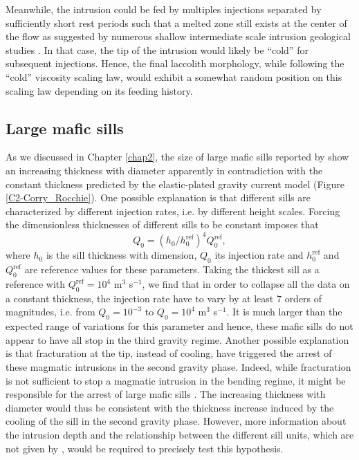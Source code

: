 Meanwhile,  the  intrusion  could   be  fed  by  multiples  injections
separated by sufficiently  short rest periods such that  a melted zone
still  exists at  the  center of  the flow  as  suggested by  numerous
shallow    intermediate    scale    intrusion    geological    studies
\citep{Habert:2004wg,Horsman:2005ct,Morgan:2008hj,Roni:2014gt}.     In
that  case, the  tip of  the intrusion  would likely  be ``cold''  for
subsequent injections.   Hence, the final laccolith  morphology, while
following the ``cold'' viscosity scaling law, would exhibit a somewhat
random position on this scaling law depending on its feeding history.


\subsection{Large mafic sills}
\label{sec:large-mafic-sill}

As we discussed in Chapter \ref{chap2},  the size of large mafic sills
reported  by  \citet{Cruden:tg}  show  an  increasing  thickness  with
diameter  apparently  in  contradiction with  the  constant  thickness
predicted  by   the  elastic-plated  gravity  current   model  (Figure
\ref{C2-Corry_Rocchie}).  One  possible explanation is  that different
sills  are  characterized  by  different  injection  rates,  i.e.   by
different  height scales.   Forcing the  dimensionless thicknesses  of
different sills to be constant imposes that
\begin{equation}
  Q_0 = (h_0/h_0^{\text{ref}})^4Q_0^{\text{ref}},
\end{equation}
where $h_0$ is the sill  thickness with dimension, $Q_0$ its injection
rate  and  $h_0^{\text{ref}}$  and  $Q_0^{\text{ref}}$  are  reference
values for these  parameters.  Taking the thickest sill  as a reference
with $Q_0^{\text{ref}} =  10^4$ m$^3$ s$^{-1}$, we find  that in order
to collapse all  the data on a constant thickness,  the injection rate
have  to  vary by  at  least  $7$  orders  of magnitudes,  i.e.   from
$Q_0=10^{-3}$ to $Q_0= 10^{4}$ m$^3$  s$^{-1}$. It is much larger than
the expected range  of variations for this parameter  and hence, these
mafic  sills do  not appear  to  have all  stop in  the third  gravity
regime. Another possible explanation is  that fracturation at the tip,
instead  of  cooling, have  triggered  the  arrest of  these  magmatic
intrusions in the second gravity phase.  Indeed, while fracturation is
not sufficient to stop a magmatic  intrusion in the bending regime, it
might   be  responsible   for  the   arrest  of   large  mafic   sills
\citep{Michaut:2011kg}.  The increasing  thickness with diameter would
thus be consistent with the  thickness increase induced by the cooling
of the  sill in the  second gravity phase.  However,  more information
about the intrusion  depth and the relationship  between the different
sill  units,  which  are  not given  by  \citet{Cruden:tg},  would  be
required to precisely test this hypothesis.


